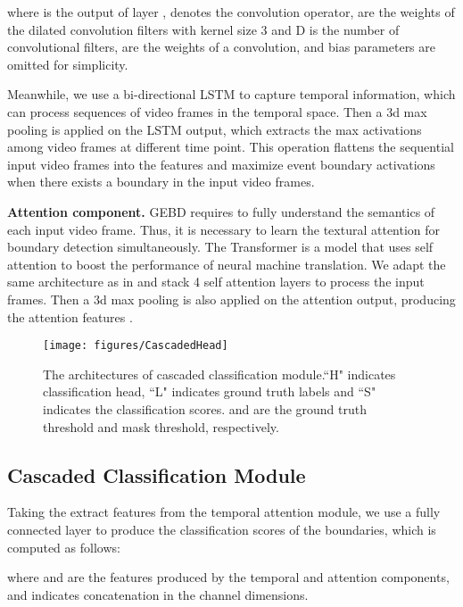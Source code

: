 \documentclass[final]{cvpr}
\begin{document}
where  is the output of layer ,  denotes the convolution operator,  are the weights of the dilated convolution filters with kernel size 3 and D is the number of convolutional filters,  are the weights of a  convolution, and bias parameters are omitted for simplicity.

Meanwhile, we use a bi-directional LSTM \cite{DBLP:journals/neco/LSTM} to capture temporal information, which can process sequences of video frames in the temporal space. Then a 3d max pooling is applied on the LSTM output, which extracts the max activations among video frames at different time point. This operation flattens the sequential input video frames into the features  and maximize event boundary activations when there exists a boundary in the input video frames.

\noindent\textbf{Attention component.} GEBD requires to fully understand the semantics of each input video frame. Thus, it is necessary to learn the textural attention for boundary detection simultaneously. The Transformer \cite{DBLP:conf/nips/attention} is a model that uses self attention to boost the performance of neural machine translation. We adapt the same architecture as in \cite{DBLP:conf/nips/attention} and stack 4 self attention layers to process the input frames. Then a 3d max pooling is also applied on the attention output, producing the attention features .


\begin{figure}
\begin{center}
\texttt{[image: figures/CascadedHead]}
\end{center}
   \caption{The architectures of cascaded classification module.``H" indicates classification head, ``L" indicates ground truth labels and ``S" indicates the classification scores.  and  are the ground truth threshold and mask threshold, respectively.}
\label{fig:cascade_head}
\end{figure}


\subsection{Cascaded Classification Module}\label{sec:cascaded_classifier}
Taking the extract features from the temporal attention module, we use a fully connected layer to produce the classification scores of the boundaries, which is computed as follows:

where  and  are the features produced by the temporal and attention components, and  indicates concatenation in the channel dimensions.
\end{document}
